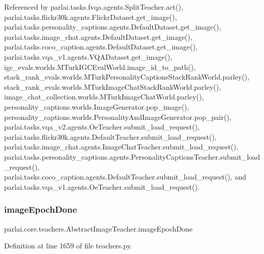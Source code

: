 Referenced by parlai.\+tasks.\+fvqa.\+agents.\+Split\+Teacher.\+act(), parlai.\+tasks.\+flickr30k.\+agents.\+Flickr\+Dataset.\+get\+\_\+image(), parlai.\+tasks.\+personality\+\_\+captions.\+agents.\+Default\+Dataset.\+get\+\_\+image(), parlai.\+tasks.\+image\+\_\+chat.\+agents.\+Default\+Dataset.\+get\+\_\+image(), parlai.\+tasks.\+coco\+\_\+caption.\+agents.\+Default\+Dataset.\+get\+\_\+image(), parlai.\+tasks.\+vqa\+\_\+v1.\+agents.\+V\+Q\+A\+Dataset.\+get\+\_\+image(), igc\+\_\+evals.\+worlds.\+M\+Turk\+I\+G\+C\+Eval\+World.\+image\+\_\+id\+\_\+to\+\_\+path(), stack\+\_\+rank\+\_\+evals.\+worlds.\+M\+Turk\+Personality\+Captions\+Stack\+Rank\+World.\+parley(), stack\+\_\+rank\+\_\+evals.\+worlds.\+M\+Turk\+Image\+Chat\+Stack\+Rank\+World.\+parley(), image\+\_\+chat\+\_\+collection.\+worlds.\+M\+Turk\+Image\+Chat\+World.\+parley(), personality\+\_\+captions.\+worlds.\+Image\+Generator.\+pop\+\_\+image(), personality\+\_\+captions.\+worlds.\+Personality\+And\+Image\+Generator.\+pop\+\_\+pair(), parlai.\+tasks.\+vqa\+\_\+v2.\+agents.\+Oe\+Teacher.\+submit\+\_\+load\+\_\+request(), parlai.\+tasks.\+flickr30k.\+agents.\+Default\+Teacher.\+submit\+\_\+load\+\_\+request(), parlai.\+tasks.\+image\+\_\+chat.\+agents.\+Image\+Chat\+Teacher.\+submit\+\_\+load\+\_\+request(), parlai.\+tasks.\+personality\+\_\+captions.\+agents.\+Personality\+Captions\+Teacher.\+submit\+\_\+load\+\_\+request(), parlai.\+tasks.\+coco\+\_\+caption.\+agents.\+Default\+Teacher.\+submit\+\_\+load\+\_\+request(), and parlai.\+tasks.\+vqa\+\_\+v1.\+agents.\+Oe\+Teacher.\+submit\+\_\+load\+\_\+request().

\mbox{\label{classparlai_1_1core_1_1teachers_1_1AbstractImageTeacher_a5e814d24d81975556ee474c89d5fee5a}} 
\subsubsection{\texorpdfstring{image\+Epoch\+Done}{imageEpochDone}}
{\footnotesize\ttfamily parlai.\+core.\+teachers.\+Abstract\+Image\+Teacher.\+image\+Epoch\+Done}



Definition at line 1659 of file teachers.\+py.



